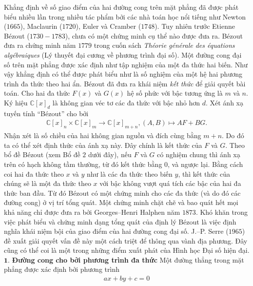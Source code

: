\begin{multicols}{2}
	\vskip 0.1cm
	Khẳng định về số giao điểm của hai đường cong trên mặt phẳng đã được phát biểu nhiều lần trong nhiều tác phẩm bởi các nhà toán học nổi tiếng như Newton ($1665$), Maclaurin ($1720$), Euler và Cramber ($1748$). Tuy nhiên trước Etienne Bézout ($1730-1783$), chưa có một chứng minh cụ thể nào được đưa ra. 
	\vskip 0.1cm
	Bézout đưa ra chứng minh năm $1779$ trong cuốn sách {\em Théorie générale des équations algébraiques} (Lý thuyết đại cương về phương trình đại số). Một đường cong đại số trên mặt phẳng được xác định như tập nghiệm của một đa thức hai biến. Như vậy khẳng định có thể được phát biểu như là số nghiệm của một hệ hai phương trình đa thức theo hai ẩn.
	Bézout đã đưa ra khái niệm {\em kết thức} để giải quyết bài toán. Cho hai đa thức $F(x)$ và $G(x)$ hệ số phức với bậc tương ứng là $m$ và $n$. Ký hiệu $\mathbb C[x]_d$ là không gian véc tơ các đa thức với bậc nhỏ hơn $d$. Xét ánh xạ tuyến tính ``Bézout'' cho bởi 
	\begin{align*}
		\mathbb C[x]_n\!\times\! \mathbb C[x]_m \!\rightarrow\!  \mathbb C[x]_{m\!+\!n},
		(A,B)\!\mapsto\! AF\!+\!BG.
	\end{align*}
	Nhận xét là số chiều của hai không gian nguồn và đích cùng bằng $m+n$. Do đó ta có thể xét định thức của ánh xạ này. Đây chính là kết thức của $F$ và $G$. Theo bổ đề Bézout (xem Bổ đề $2$ dưới đây), nếu $F$ và $G$ có nghiệm chung thì ánh xạ trên có hạch không tầm thường, từ đó kết thức bằng $0$, và ngược lại. 
	\vskip 0.1cm
	Bằng cách coi hai đa thức theo $x$ và $y$ như là các đa thức theo biến $y$, thì kết thức của chúng sẽ là một đa thức theo $x$ với bậc không vượt quá tích các bậc của hai đa thức ban đầu. Từ đó Bézout có một chứng minh cho các đa thức (và do đó các đường cong) ở vị trí tổng quát. 
	\vskip 0.1cm
	Một chứng minh chặt chẽ và bao quát hết mọi khả năng chỉ được đưa ra bởi Georges--Henri Halphen năm $1873$. 
	Khó khăn trong việc phát biểu và chứng minh dạng tổng quát của định lý Bézout là việc định nghĩa khái niệm bội của giao điểm của hai đường cong đại số. J.--P. Serre ($1965$) đề xuất giải quyết vấn đề này một cách triệt để thông qua vành địa phương. Đây cũng có thể coi là một trong những điểm xuất phát của Hình học Đại số hiện đại. 
	\vskip 0.1cm
	$\pmb{1.}$ \textbf{\color{duongvaotoanhoc}Đường cong cho bởi phương trình đa thức}
	\vskip 0.1cm
	Một đường thẳng trong mặt phẳng được xác định bởi phương trình  
	\begin{align*}
		ax+by+c=0
	\end{align*}

\end{multicols}
